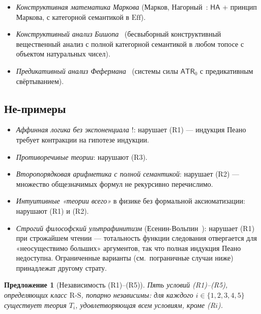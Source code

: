 \documentclass[11pt]{article}
\theoremstyle{plain}
\newtheorem{proposition}[theorem]{Предложение}
\theoremstyle{definition}
\newcommand{\RS}{\mathrm{R\text{-}S}}
\begin{document}
\begin{itemize}
\item \emph{Конструктивная математика Маркова} (Марков, Нагорный~\cite{MarkovNagornyj1988}: $\mathsf{HA}$ + принцип Маркова, с категорной семантикой в $\mathrm{Eff}$).
\item \emph{Конструктивный анализ Бишопа}~\cite{Bishop1967,BridgesVita2006} (бесвыборный конструктивный вещественный анализ с полной категорной семантикой в любом топосе с объектом натуральных чисел).
\item \emph{Предикативный анализ Фефермана}~\cite{Feferman1964} (системы силы $\mathsf{ATR}_0$ с предикативным свёртыванием).
\end{itemize}

\subsection{Не-примеры}

\begin{itemize}
\item \emph{Аффинная логика без экспоненциала $!$}: нарушает (R1) --- индукция Пеано требует контракции на гипотезе индукции.
\item \emph{Противоречивые теории}: нарушают (R3).
\item \emph{Второпорядковая арифметика с полной семантикой}: нарушает (R2) --- множество общезначимых формул не рекурсивно перечислимо.
\item \emph{Интуитивные «теории всего»} в физике без формальной аксиоматизации: нарушают (R1) и (R2).
\item \emph{Строгий философский ультрафинитизм} (Есенин-Вольпин~\cite{EseninVolpin1961,EseninVolpin1970}): нарушает (R1) при строжайшем чтении --- тотальность функции следования отвергается для «неосуществимо больших» аргументов, так что полная индукция Пеано недоступна. Ограниченные варианты (см.\ пограничные случаи ниже) принадлежат другому страту.
\end{itemize}

\begin{proposition}[Независимость (R1)--(R5)]\label{prop:rs-independence}
Пять условий (R1)--(R5), определяющих класс $\RS$, попарно независимы: для каждого $i \in \{1, 2, 3, 4, 5\}$ существует теория $T_i$, удовлетворяющая всем условиям, кроме (R$i$).
\end{proposition}
\end{document}
